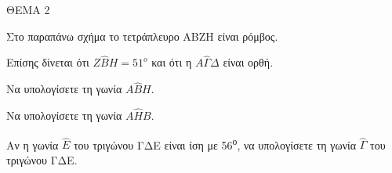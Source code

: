 
ΘΕΜΑ 2



Στο παραπάνω σχήμα το τετράπλευρο ΑΒΖΗ είναι ρόμβος.

Επίσης δίνεται ότι $Ζ\widehat{Β}Η = 51^{ο}$ και ότι η $Α\widehat{\Gamma}\Delta$ είναι ορθή.

\begin{alist}
\item Να υπολογίσετε τη γωνία $Α\widehat{Β}Η$. 

\item Να υπολογίσετε τη γωνία $Α\widehat{Η}Β$. 

\item Αν η γωνία $\widehat{Ε}$ του τριγώνου ΓΔΕ είναι ίση με 56\textsuperscript{ο}, να υπολογίσετε τη γωνία $\widehat{\Gamma}$ του τριγώνου ΓΔΕ. 
\end{alist}
